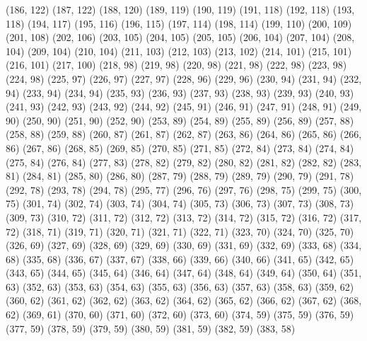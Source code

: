 {   (186, 122)
   (187, 122)
   (188, 120)
   (189, 119)
   (190, 119)
   (191, 118)
   (192, 118)
   (193, 118)
   (194, 117)
   (195, 116)
   (196, 115)
   (197, 114)
   (198, 114)
   (199, 110)
   (200, 109)
   (201, 108)
   (202, 106)
   (203, 105)
   (204, 105)
   (205, 105)
   (206, 104)
   (207, 104)
   (208, 104)
   (209, 104)
   (210, 104)
   (211, 103)
   (212, 103)
   (213, 102)
   (214, 101)
   (215, 101)
   (216, 101)
   (217, 100)
   (218, 98)
   (219, 98)
   (220, 98)
   (221, 98)
   (222, 98)
   (223, 98)
   (224, 98)
   (225, 97)
   (226, 97)
   (227, 97)
   (228, 96)
   (229, 96)
   (230, 94)
   (231, 94)
   (232, 94)
   (233, 94)
   (234, 94)
   (235, 93)
   (236, 93)
   (237, 93)
   (238, 93)
   (239, 93)
   (240, 93)
   (241, 93)
   (242, 93)
   (243, 92)
   (244, 92)
   (245, 91)
   (246, 91)
   (247, 91)
   (248, 91)
   (249, 90)
   (250, 90)
   (251, 90)
   (252, 90)
   (253, 89)
   (254, 89)
   (255, 89)
   (256, 89)
   (257, 88)
   (258, 88)
   (259, 88)
   (260, 87)
   (261, 87)
   (262, 87)
   (263, 86)
   (264, 86)
   (265, 86)
   (266, 86)
   (267, 86)
   (268, 85)
   (269, 85)
   (270, 85)
   (271, 85)
   (272, 84)
   (273, 84)
   (274, 84)
   (275, 84)
   (276, 84)
   (277, 83)
   (278, 82)
   (279, 82)
   (280, 82)
   (281, 82)
   (282, 82)
   (283, 81)
   (284, 81)
   (285, 80)
   (286, 80)
   (287, 79)
   (288, 79)
   (289, 79)
   (290, 79)
   (291, 78)
   (292, 78)
   (293, 78)
   (294, 78)
   (295, 77)
   (296, 76)
   (297, 76)
   (298, 75)
   (299, 75)
   (300, 75)
   (301, 74)
   (302, 74)
   (303, 74)
   (304, 74)
   (305, 73)
   (306, 73)
   (307, 73)
   (308, 73)
   (309, 73)
   (310, 72)
   (311, 72)
   (312, 72)
   (313, 72)
   (314, 72)
   (315, 72)
   (316, 72)
   (317, 72)
   (318, 71)
   (319, 71)
   (320, 71)
   (321, 71)
   (322, 71)
   (323, 70)
   (324, 70)
   (325, 70)
   (326, 69)
   (327, 69)
   (328, 69)
   (329, 69)
   (330, 69)
   (331, 69)
   (332, 69)
   (333, 68)
   (334, 68)
   (335, 68)
   (336, 67)
   (337, 67)
   (338, 66)
   (339, 66)
   (340, 66)
   (341, 65)
   (342, 65)
   (343, 65)
   (344, 65)
   (345, 64)
   (346, 64)
   (347, 64)
   (348, 64)
   (349, 64)
   (350, 64)
   (351, 63)
   (352, 63)
   (353, 63)
   (354, 63)
   (355, 63)
   (356, 63)
   (357, 63)
   (358, 63)
   (359, 62)
   (360, 62)
   (361, 62)
   (362, 62)
   (363, 62)
   (364, 62)
   (365, 62)
   (366, 62)
   (367, 62)
   (368, 62)
   (369, 61)
   (370, 60)
   (371, 60)
   (372, 60)
   (373, 60)
   (374, 59)
   (375, 59)
   (376, 59)
   (377, 59)
   (378, 59)
   (379, 59)
   (380, 59)
   (381, 59)
   (382, 59)
   (383, 58)
}
